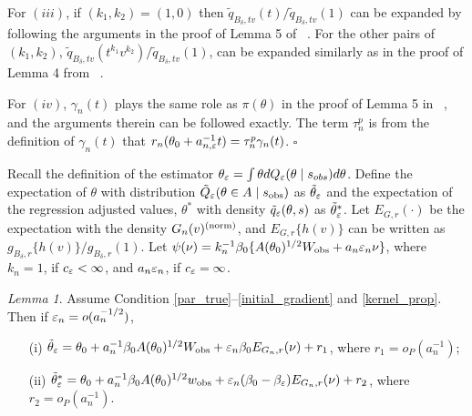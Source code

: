 \documentclass[9pt]{article}
\theoremstyle{remark}
\newtheorem{lemma}{Lemma}
\newcommand{\ST}[1]{{\color{blue}{#1}}}
\newcommand{\WL}[1]{{\color{green}{#1}}}
\begin{document}
	For $(iii)$, if $(k_1,k_2)=(1,0)$ then $\tilde{q}_{B_{\delta},tv}(t)/\tilde{q}_{B_{\delta},tv}(1)$
	can be expanded by following the arguments in the proof of Lemma 5
	of ~\cite{Li2016}. For the other pairs of $(k_1,k_2)$, $\tilde{q}_{B_{\delta},tv}(t^{k_{1}}v^{k_{2}})/\tilde{q}_{B_{\delta},tv}(1)$,
	can be expanded similarly as in the proof of Lemma 4 from ~\cite{Li2017}.
	
	For $(iv)$, $\gamma_{n}(t)$ plays the same role as $\pi(\theta)$
	in the proof of Lemma 5 in ~\cite{Li2016}, and the arguments therein
	can be followed exactly. The term $\tau_{n}^{p}$ is from the definition
	of $\gamma_{n}(t)$ that $r_{n}(\theta_0+a_{n,\varepsilon}^{-1}t)=\tau_{n}^{p}\gamma_{n}(t)$.
	\hfill{$\square$} 
	
	

Recall the definition of the estimator $\theta_{\varepsilon} = \int \theta dQ_{\varepsilon}(\theta \mid s_{obs}) d\theta$. Define the expectation of $\theta$ with distribution $\tilde{Q}_{\varepsilon}(\theta\in A\mid s_{\rm obs})$
as $\tilde{\theta}_{\varepsilon}$ and the expectation of the regression adjusted values, $\theta^*$ 
with density $\tilde{q}_{\varepsilon}(\theta,s)$ as $\tilde{\theta}_{\varepsilon}^{*}$.
Let $E_{G,r}(\cdot)$ be the expectation with the density $G_{n}(v)^{({\rm norm})}$,
and $E_{G,r}\{h(v)\}$ can be written as $g_{B_{\delta},r}\{h(v)\}/g_{B_{\delta},r}(1)$.
Let $\psi(\nu)=k_{n}^{-1}\beta_{0}\{A(\theta_{0})^{1/2}W_{\rm obs}+a_{n}\varepsilon_{n}\nu\}$,
where $k_{n}=1$, if $c_{\varepsilon}<\infty$, and $a_{n}\varepsilon_{n}$,
if $c_{\varepsilon}=\infty$. 


\begin{lemma}\label{Alemma3} Assume Condition \ref{par_true}--\ref{initial_gradient} and \ref{kernel_prop}. Then if $\varepsilon_{n}=o(a_{n}^{-1/2})$, 
	\begin{enumerate}
		\item[(i)] $\tilde{\theta}_{\varepsilon}=\theta_{0}+a_{n}^{-1}\beta_{0}A(\theta_{0})^{1/2}W_{\rm obs}+\varepsilon_{n}\beta_{0}E_{G_{n},r}(\nu)+r_{1}$,
		where $r_{1}=o_{P}(a_{n}^{-1})$; 
		\item[(ii)] $\tilde{\theta}_{\varepsilon}^{*}=\theta_{0}+a_{n}^{-1}\beta_{0}A(\theta_{0})^{1/2}w_{\rm obs}+\varepsilon_{n}(\beta_{0}-\beta_{\varepsilon})E_{G_{n},r}(\nu)+r_{2}$,
		where $r_{2}=o_{P}(a_{n}^{-1})$. 
	\end{enumerate}\end{lemma}

\end{document}
